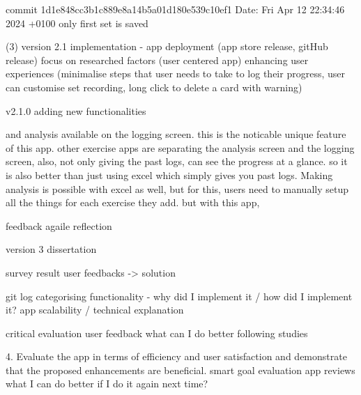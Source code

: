 commit 1d1e848cc3b1c889e8a14b5a01d180e539c10ef1
Date:   Fri Apr 12 22:34:46 2024 +0100
    only first set is saved


(3) version 2.1 implementation - app deployment (app store release, gitHub release)
focus on researched factors (user centered app)
enhancing user experiences
(minimalise steps that user needs to take to log their progress, user can customise set recording, long click to delete a card with warning)



\version v2.1.0 {
    adding new functionalities
} 










and analysis available on the logging screen. 
this is the noticable unique feature of this app. 
other exercise apps are separating the analysis screen and the logging screen, 
also, not only giving the past logs, can see the progress at a glance. 
so it is also better than just using excel which simply gives you past logs.
Making analysis is possible with excel as well, but for this, users need to manually setup all the things for each exercise they add.
but with this app, 



feedback agaile reflection


version 3 dissertation

survey result
user feedbacks -> solution


git log categorising
functionality - why did I implement it / how did I implement it?
app scalability / technical explanation



critical evaluation
user feedback
what can I do better
following studies

4. Evaluate the app in terms of efficiency and user satisfaction and demonstrate that the proposed enhancements are beneficial.
	smart goal evaluation
	app reviews
	what I can do better if I do it again next time?